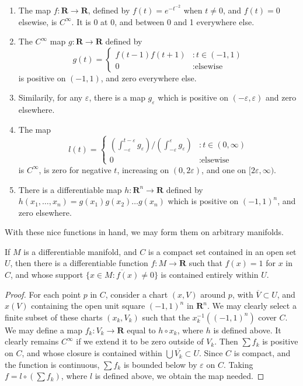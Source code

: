 \begin{enumerate}
    \item The map $f:\mathbf{R} \to \mathbf{R}$, defined by $f(t) = e^{-t^{-2}}$ when $t \neq 0$, and $f(t) = 0$ elsewise, is $C^\infty$. It is 0 at 0, and between 0 and 1 everywhere else.
    \item The $C^\infty$ map $g:\mathbf{R} \to \mathbf{R}$ defined by
    \[
    g(t) =
    \begin{cases} 
        f(t - 1)f(t + 1) & : t \in (-1, 1) \\
        0 & : \text{elsewise}
    \end{cases}
    \]
    is positive on $(-1,1)$, and zero everywhere else.
    \item Similarily, for any $\varepsilon$, there is a map $g_\varepsilon$ which is positive on $(-\varepsilon, \varepsilon)$ and zero elsewhere.
    \item The map 
    \[ l(t) = \begin{cases}
        \left(\int_{-\varepsilon}^{t - \varepsilon} g_\varepsilon \right)/\left(\int_{-\varepsilon}^\varepsilon g_\varepsilon \right) & : t \in (0, \infty) \\
        0 & : \text{elsewise}
    \end{cases} \]
    is $C^\infty$, is zero for negative $t$, increasing on $(0, 2\varepsilon)$, and one on $[2\varepsilon, \infty)$.
    \item There is a differentiable map $h:\mathbf{R}^n \to \mathbf{R}$ defined by $h(x_1, \dots, x_n) = g(x_1) g(x_2) \dots g(x_n)$ which is positive on $(-1, 1)^n$, and zero elsewhere.
\end{enumerate}

With these nice functions in hand, we may form them on arbitrary manifolds.

\begin{theorem}
    If $M$ is a differentiable manifold, and $C$ is a compact set contained in an open set $U$, then there is a differentiable function $f:M \to \mathbf{R}$ such that $f(x) = 1$ for $x$ in $C$, and whose support $\overline{\{ x \in M : f(x) \neq 0 \}}$ is contained entirely within $U$.
\end{theorem}
\begin{proof}
    For each point $p$ in $C$, consider a chart $(x,V)$ around $p$, with $\overline{V} \subset U$, and $x(V)$ containing the open unit square $(-1,1)^n$ in $\mathbf{R}^n$. We may clearly select a finite subset of these charts $(x_k,V_k)$ such that the $x_k^{-1}((-1,1)^n)$ cover $C$. We may define a map $f_k:V_k \to \mathbf{R}$ equal to $h \circ x_k$, where $h$ is defined above. It clearly remains $C^\infty$ if we extend it to be zero outside of $V_k$. Then $\sum f_k$ is positive on $C$, and whose closure is contained within $\bigcup \overline{V_k} \subset U$. Since $C$ is compact, and the function is continuous, $\sum f_k$ is bounded below by $\varepsilon$ on $C$. Taking $f = l \circ (\sum f_k)$, where $l$ is defined above, we obtain the map needed.
\end{proof}

